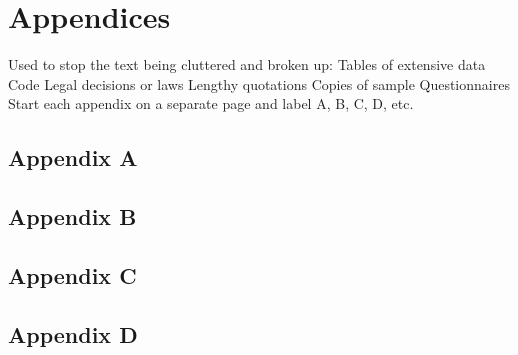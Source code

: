 \section{Appendices}

\begin{outline}
    \1 Used to stop the text being cluttered and broken up:
        \2 Tables of extensive data
        \2 Code 
        \2 Legal decisions or laws
        \2 Lengthy quotations
        \2 Copies of sample Questionnaires
    \1 Start each appendix on a separate page and label A, B, C, D, etc.
\end{outline}

\subsection{Appendix A}


\subsection{Appendix B}


\subsection{Appendix C}


\subsection{Appendix D}

